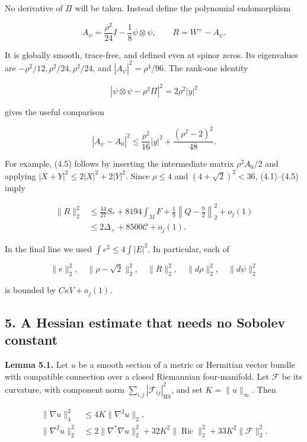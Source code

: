 \documentclass[
  10pt,
]{article}
\begin{document}
No derivative of \(\Pi\) will be taken. Instead define the polynomial
endomorphism

\[
       A_\psi=\frac{\rho^2}{24}I-\frac18\psi\otimes\psi,
             \qquad R=W^+-A_\psi.                       \tag{4.4}
\]

It is globally smooth, trace-free, and defined even at spinor zeros. Its
eigenvalues are \(-\rho^2/12,\rho^2/24,\rho^2/24\), and
\(|A_\psi|^2=\rho^4/96\). The rank-one identity

\[
 |\psi\otimes\psi-\rho^2\Pi|^2=2\rho^2|y|^2
\]

gives the useful comparison

\[
 |A_\psi-A_0|^2
       \le\frac{\rho^2}{16}|y|^2+\frac{(\rho^2-2)^2}{48}.
 \tag{4.5}
\]

For example, (4.5) follows by inserting the intermediate matrix
\(\rho^2 A_0/2\) and applying \(|X+Y|^2\le2|X|^2+2|Y|^2\). Since
\(\rho\le4\) and \((4+\sqrt2)^2<36\), (4.1)--(4.5) imply

\[
 \begin{aligned}
 \|R\|_2^2
 &\le\frac{44}{27}S_*+8194\int_MF
                     +\frac19\left\|Q-\frac92\right\|_2^2+o_j(1)\\
 &\le2\Delta_++8500\mathcal C+o_j(1).
 \end{aligned}                                              \tag{4.6}
\]

In the final line we used \(\int e^2\le4\int|E|^2\). In particular, each
of

\[
 \|e\|_2^2,\quad\|\rho-\sqrt2\|_2^2,\quad\|R\|_2^2,
            \quad\|d\rho\|_2^2,\quad\|d\psi\|_2^2
\]

is bounded by \(C\kappa V+o_j(1)\).

\hypertarget{a-hessian-estimate-that-needs-no-sobolev-constant}{%
\subsection{5. A Hessian estimate that needs no Sobolev
constant}\label{a-hessian-estimate-that-needs-no-sobolev-constant}}

\textbf{Lemma 5.1.} Let \(u\) be a smooth section of a metric or
Hermitian vector bundle with compatible connection over a closed
Riemannian four-manifold. Let \(\mathscr F\) be its curvature, with
component norm \(\sum_{i,j}|\mathscr F_{ij}|_{\mathrm{HS}}^2\), and set
\(K=\|u\|_\infty\). Then

\[
 \begin{aligned}
 \|\nabla u\|_4^2&\le4K\|\nabla^2u\|_2,\\
 \|\nabla^2u\|_2^2
 &\le2\|\nabla^*\nabla u\|_2^2
       +32K^2\|\operatorname{Ric}\|_2^2
       +33K^2\|\mathscr F\|_2^2.
 \end{aligned}                                              \tag{5.1}
\]
\end{document}
